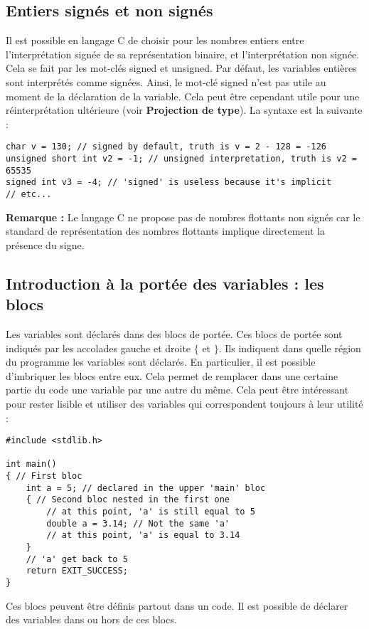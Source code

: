 \documentclass[../../../main.tex]{subfiles}
\begin{document}
\subsection{Entiers signés et non signés}
Il est possible en langage C de choisir pour les nombres entiers entre l'interprétation signée de sa représentation binaire, et l'interprétation non signée. Cela se fait par les mot-clés \textsf{signed} et \textsf{unsigned}. Par défaut, les variables entières sont interprétés comme signées. Ainsi, le mot-clé \textsf{signed} n'est pas utile au moment de la déclaration de la variable. Cela peut être cependant utile pour une réinterprétation ultérieure (voir \textbf{Projection de type}). La syntaxe est la suivante :
\begin{verbatim}
char v = 130; // signed by default, truth is v = 2 - 128 = -126
unsigned short int v2 = -1; // unsigned interpretation, truth is v2 = 65535
signed int v3 = -4; // 'signed' is useless because it's implicit
// etc...
\end{verbatim}
\textbf{Remarque :} Le langage C ne propose pas de nombres flottants non signés car le standard de représentation des nombres flottants implique directement la présence du signe.
\subsection{Introduction à la portée des variables : les blocs}
Les variables sont déclarés dans des blocs de portée. Ces blocs de portée sont indiqués par les accolades gauche et droite $\{$ et $\}$. Ils indiquent dans quelle région du programme les variables sont déclarés. En particulier, il est possible d'imbriquer les blocs entre eux. Cela permet de remplacer dans une certaine partie du code une variable par une autre du même. Cela peut être intéressant pour rester lisible et utiliser des variables qui correspondent toujours à leur utilité :
\begin{verbatim}
#include <stdlib.h>

int main()
{ // First bloc
	int a = 5; // declared in the upper 'main' bloc
	{ // Second bloc nested in the first one
		// at this point, 'a' is still equal to 5
		double a = 3.14; // Not the same 'a'
		// at this point, 'a' is equal to 3.14
	}
	// 'a' get back to 5
	return EXIT_SUCCESS;
}
\end{verbatim}
Ces blocs peuvent être définis partout dans un code. Il est possible de déclarer des variables dans ou hors de ces blocs.
 
\end{document}
